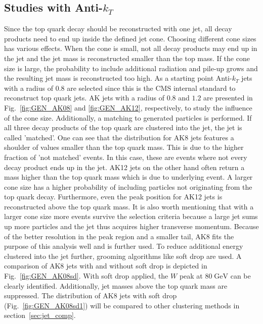 \FloatBarrier %
\subsection{Studies with Anti-$k_T$}
\label{sec:AK}	
	Since the top quark decay should be reconstructed with one jet, all decay products need to end up inside the defined jet cone. Choosing different cone sizes has various effects. When the cone is small, not all decay products may end up in the jet and the jet mass is reconstructed smaller than the top mass. If the cone size is large, the probability to include additional radiation and pile-up grows and the resulting jet mass is reconstructed too high.	As a starting point Anti-$k_T$ jets with a radius of $0.8$ are selected since this is the CMS internal standard to reconstruct top quark jets. AK jets with a radius of $0.8$ and $1.2$ are presented in Fig.~\ref{fig:GEN_AK08} and \ref{fig:GEN_AK12}, respectively, to study the influence of the cone size. Additionally, a matching to generated particles is performed. If all three decay products of the top quark are clustered into the jet, the jet is called 'matched'. One can see that the distribution for AK8 jets features a shoulder of values smaller than the top quark mass. This is due to the higher fraction of 'not matched' events. In this case, these are events where not every decay product ends up in the jet. AK12 jets on the other hand often return a mass higher than the top quark mass which is due to underlying event. A larger cone size has a higher probability of including particles not originating from the top quark decay. Furthermore, even the peak position for AK12 jets is reconstructed above the top quark mass. It is also worth mentioning that with a larger cone size more events survive the selection criteria because a large jet sums up more particles and the jet thus acquires higher transverse momentum. Because of the better resolution in the peak region and a smaller tail, AK8 fits the purpose of this analysis well and is further used. To reduce additional energy clustered into the jet further, grooming algorithms like soft drop are used. A comparison of AK8 jets with and without soft drop is depicted in Fig.~\ref{fig:GEN_AK08sd}. With soft drop applied, the $W$ peak at $80\;\text{GeV}$ can be clearly identified. Additionally, jet masses above the top quark mass are suppressed. The distribution of AK8 jets with soft drop (Fig.~\ref{fig:GEN_AK08sd1}) will be compared to other clustering methods in section~\ref{sec:jet_comp}.

